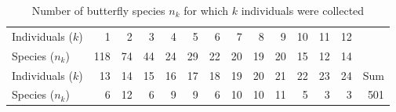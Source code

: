 
\begin{table}[ht]
\centering
\caption{Number of butterfly species $n_k$ for which $k$ individuals were collected} \label{tab:buttertab}
\begin{tabular}{l|rrrrrrrrrrrr|r}
   \hline
Individuals ($k$) & 1 & 2 & 3 & 4 & 5 & 6 & 7 & 8 & 9 & 10 & 11 & 12 \\
Species ($n_k$)   & 118 &  74 &  44 &  24 &  29 &  22 &  20 &  19 &  20 &  15 &  12 &  14 \\
   \hline \hline
Individuals ($k$) & 13 & 14 & 15 & 16 & 17 & 18 & 19 & 20 & 21 & 22 & 23 & 24 & Sum \\ 
Species ($n_k$)   &   6 &  12 &   6 &   9 &   9 &   6 &  10 &  10 &  11 &   5 &   3 &   3 & 501 \\ 
   \hline
  \end{tabular}
\end{table}

 
